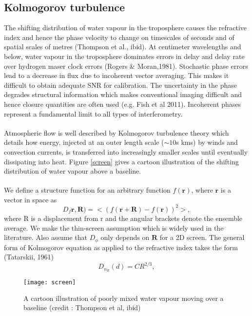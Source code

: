 \subsection{Kolmogorov turbulence} \label{turb}
The shifting distribution of water vapour in the troposphere causes the refractive index and hence the phase velocity to change on timescales of seconds and of spatial scales of metres (Thompson et al., ibid).  At centimeter wavelengths and below, water vapour in the troposphere dominates errors in delay and delay rate over hydrogen maser clock errors (Rogers \& Moran,1981). Stochastic phase errors lead to a decrease in flux due to incoherent vector averaging. This makes it difficult to obtain adequate SNR for calibration. The uncertainty in the phase degrades structural information which makes conventional imaging difficult and hence closure quantities are often used (e.g. Fish et al 2011). Incoherent phases represent a fundamental limit to all types of interferometry. \\
~\\
Atmospheric flow is well described by Kolmogorov turbulence theory which details how energy, injected at an outer length scale ($\sim 10$s kms) by winds and convection currents, is transferred into increasingly smaller scales until eventually dissipating into heat. Figure \ref{screen} gives a cartoon illustration of the shifting distribution of water vapour above a baseline. \\
~\\
We define a structure function for an arbitrary function $f(\mathbf{r})$, where $\mathbf{r}$ is a vector in space as
\begin{equation}
D_f \mathbf{r},\mathbf{R}) = < ( f(\mathbf{r} +\mathbf{R}) - f(\mathbf{r}))^2>,
\end{equation}
where R is a displacement from r and the angular brackets denote the ensemble average. We make the thin-screen assumption which is widely used in the literature.  Also assume that $D_\phi$ only depends on $\mathbf{R}$ for a 2D screen. The general form of Kolmogorov equation as applied to the refractive index takes the form (Tatarskii, 1961) \\
\begin{equation}\label{kolmogorov}
D_{n_{R}} (d) = C R^{2/3},
\end{equation}

\begin{figure}[h!]
\centering
    \texttt{[image: screen]}
    \caption{A cartoon illustration of poorly mixed water vapour moving over a baseline (credit : Thompson et al, ibid) \label{phase:screen}}
\end{figure}

